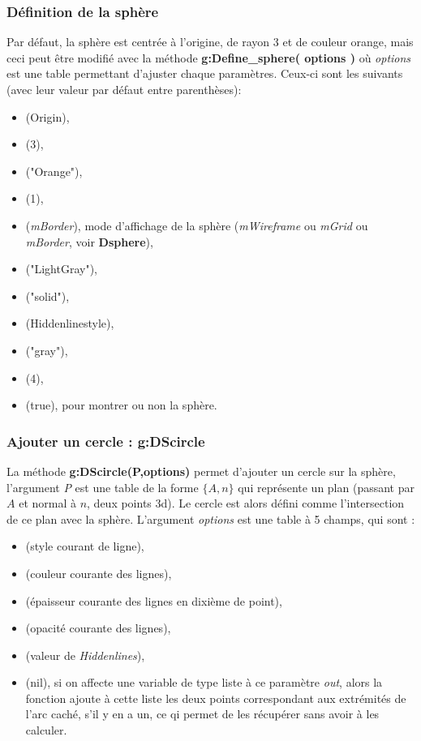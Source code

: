 \subsubsection{Définition de la sphère}
Par défaut, la sphère est centrée à l'origine, de rayon $3$ et de couleur orange, mais ceci peut être modifié avec la méthode \textbf{g:Define\_sphere( options )} où \emph{options} est une table permettant d'ajuster chaque paramètres. Ceux-ci sont les suivants (avec leur valeur par défaut entre parenthèses):
\begin{itemize}
    \item {} (Origin),
    \item {} (3),
    \item {} ("Orange"),
    \item {} (1),
    \item {} (\emph{mBorder}), mode d'affichage de la sphère (\emph{mWireframe} ou \emph{mGrid} ou \emph{mBorder}, voir \textbf{Dsphere}),
    \item {} ("LightGray"),
    \item {} ("solid"),
    \item {} (Hiddenlinestyle),
    \item {} ("gray"),
    \item {} (4),
    \item {} (true), pour montrer ou non la sphère.
\end{itemize}

\subsubsection{Ajouter un cercle : g:DScircle}

La méthode \textbf{g:DScircle(P,options)} permet d'ajouter un cercle sur la sphère, l'argument \emph{P} est une table de la forme $\{A,n\}$ qui représente un plan (passant par $A$ et normal à $n$, deux points 3d). Le cercle est alors défini comme l'intersection de ce plan avec la sphère. L'argument \emph{options} est une table à 5 champs, qui sont :
    \begin{itemize}
        \item {} (style courant de ligne), 
        \item {} (couleur courante des lignes),
        \item {} (épaisseur courante des lignes en dixième de point),
        \item {} (opacité courante des lignes),
        \item {} (valeur de \emph{Hiddenlines}),
        \item {} (nil), si on affecte une variable de type liste à ce paramètre \emph{out}, alors la fonction ajoute à cette liste les deux points correspondant aux extrémités de l'arc caché, s'il y en a un, ce qi permet de les récupérer sans avoir à les calculer.
    \end{itemize}
    
